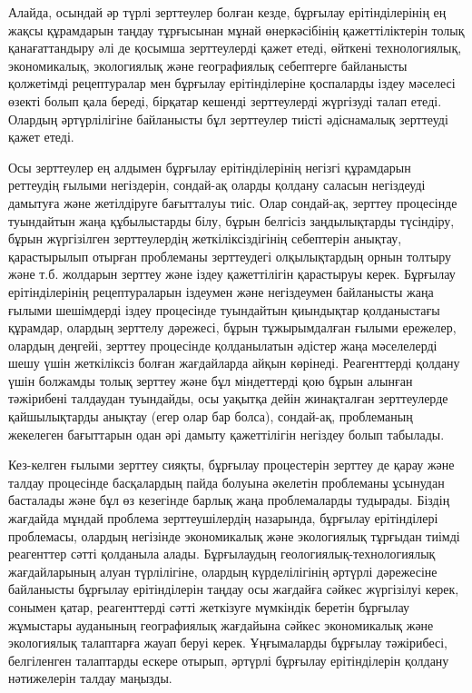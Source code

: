 \begin{multicols}{2}
Алайда, осындай әр түрлі зерттеулер болған кезде, бұрғылау
ерітінділерінің ең жақсы құрамдарын таңдау тұрғысынан мұнай
өнеркәсібінің қажеттіліктерін толық қанағаттандыру әлі де қосымша
зерттеулерді қажет етеді, өйткені технологиялық, экономикалық,
экологиялық және географиялық себептерге байланысты қолжетімді
рецептуралар мен бұрғылау ерітінділеріне қоспаларды іздеу мәселесі
өзекті болып қала береді, бірқатар кешенді зерттеулерді жүргізуді талап
етеді. Олардың әртүрлілігіне байланысты бұл зерттеулер тиісті
әдіснамалық зерттеуді қажет етеді.

Осы зерттеулер ең алдымен бұрғылау ерітінділерінің негізгі құрамдарын
реттеудің ғылыми негіздерін, сондай-ақ оларды қолдану саласын негіздеуді
дамытуға және жетілдіруге бағытталуы тиіс. Олар сондай-ақ, зерттеу
процесінде туындайтын жаңа құбылыстарды білу, бұрын белгісіз
заңдылықтарды түсіндіру, бұрын жүргізілген зерттеулердің
жеткіліксіздігінің себептерін анықтау, қарастырылып отырған проблеманы
зерттеудегі олқылықтардың орнын толтыру және т.б. жолдарын зерттеу және
іздеу қажеттілігін қарастыруы керек. Бұрғылау ерітінділерінің
рецептураларын іздеумен және негіздеумен байланысты жаңа ғылыми
шешімдерді іздеу процесінде туындайтын қиындықтар қолданыстағы құрамдар,
олардың зерттелу дәрежесі, бұрын тұжырымдалған ғылыми ережелер, олардың
деңгейі, зерттеу процесінде қолданылатын әдістер жаңа мәселелерді шешу
үшін жеткіліксіз болған жағдайларда айқын көрінеді. Реагенттерді қолдану
үшін болжамды толық зерттеу және бұл міндеттерді қою бұрын алынған
тәжірибені талдаудан туындайды, осы уақытқа дейін жинақталған
зерттеулерде қайшылықтарды анықтау (егер олар бар болса), сондай-ақ,
проблеманың жекелеген бағыттарын одан әрі дамыту қажеттілігін негіздеу
болып табылады.

Кез-келген ғылыми зерттеу сияқты, бұрғылау процестерін зерттеу де қарау
және талдау процесінде басқалардың пайда болуына әкелетін проблеманы
ұсынудан басталады және бұл өз кезегінде барлық жаңа проблемаларды
тудырады. Біздің жағдайда мұндай проблема зерттеушілердің назарында,
бұрғылау ерітінділері проблемасы, олардың негізінде экономикалық және
экологиялық тұрғыдан тиімді реагенттер сәтті қолданыла алады.
Бұрғылаудың геологиялық-технологиялық жағдайларының алуан түрлілігіне,
олардың күрделілігінің әртүрлі дәрежесіне байланысты бұрғылау
ерітінділерін таңдау осы жағдайға сәйкес жүргізілуі керек, сонымен
қатар, реагенттерді сәтті жеткізуге мүмкіндік беретін бұрғылау жұмыстары
ауданының географиялық жағдайына сәйкес экономикалық және экологиялық
талаптарға жауап беруі керек. Ұңғымаларды бұрғылау тәжірибесі,
белгіленген талаптарды ескере отырып, әртүрлі бұрғылау ерітінділерін
қолдану нәтижелерін талдау маңызды.


\end{multicols}
